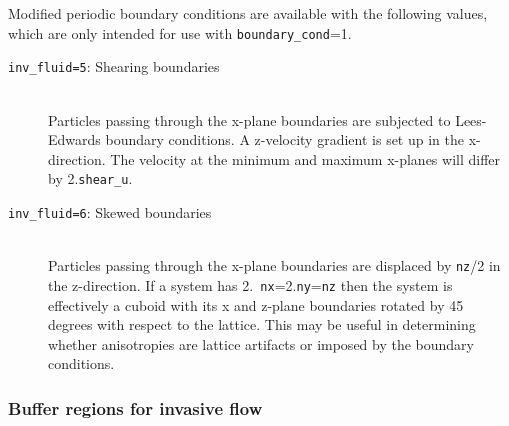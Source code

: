 \documentclass[a4paper]{article}
\begin{document}
Modified periodic boundary conditions are available with the following values,
which are only intended for use with {\tt boundary\_cond}=1. 

\begin{description}
	\item[{\tt inv\_fluid=5}: Shearing boundaries]\ \\
		Particles passing through the x-plane boundaries are subjected
		to Lees-Edwards boundary conditions. A z-velocity gradient is
		set up in the x-direction. The velocity at the minimum and
		maximum x-planes will differ by 2.{\tt shear\_u}.
	\item[{\tt inv\_fluid=6}: Skewed boundaries]\ \\
		Particles passing through the x-plane boundaries are displaced
		by {\tt nz}/2 in the z-direction. If a system has 2.{\tt
		nx}=2.{\tt ny}={\tt nz} then the system is effectively a cuboid
		with its x and z-plane boundaries rotated by 45 degrees with
		respect to the lattice. This may be useful in determining whether
		anisotropies are lattice artifacts or imposed by the boundary
		conditions.
\end{description}


\subsubsection{Buffer regions for invasive flow}
\end{document}
